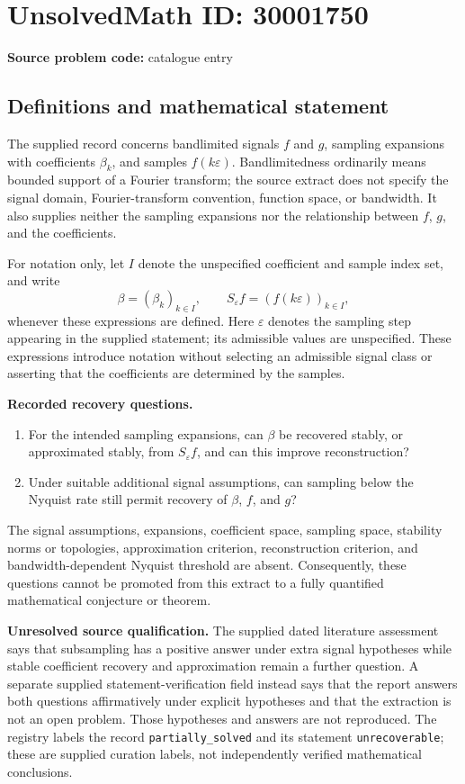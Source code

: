\documentclass[11pt]{article}
\begin{document}
\section*{UnsolvedMath ID: 30001750}
\textbf{Source problem code:} catalogue entry
\subsection{Definitions and mathematical statement}
The supplied record concerns bandlimited signals \(f\) and \(g\), sampling expansions with coefficients \(\beta_k\), and samples \(f(k\varepsilon)\). Bandlimitedness ordinarily means bounded support of a Fourier transform; the source extract does not specify the signal domain, Fourier-transform convention, function space, or bandwidth. It also supplies neither the sampling expansions nor the relationship between \(f\), \(g\), and the coefficients.

For notation only, let \(I\) denote the unspecified coefficient and sample index set, and write
\[
\beta=(\beta_k)_{k\in I},\qquad S_{\varepsilon}f=(f(k\varepsilon))_{k\in I},
\]
whenever these expressions are defined. Here \(\varepsilon\) denotes the sampling step appearing in the supplied statement; its admissible values are unspecified. These expressions introduce notation without selecting an admissible signal class or asserting that the coefficients are determined by the samples.

\textbf{Recorded recovery questions.}
\begin{enumerate}
\item For the intended sampling expansions, can \(\beta\) be recovered stably, or approximated stably, from \(S_{\varepsilon}f\), and can this improve reconstruction?
\item Under suitable additional signal assumptions, can sampling below the Nyquist rate still permit recovery of \(\beta\), \(f\), and \(g\)?
\end{enumerate}
The signal assumptions, expansions, coefficient space, sampling space, stability norms or topologies, approximation criterion, reconstruction criterion, and bandwidth-dependent Nyquist threshold are absent. Consequently, these questions cannot be promoted from this extract to a fully quantified mathematical conjecture or theorem.

\textbf{Unresolved source qualification.} The supplied dated literature assessment says that subsampling has a positive answer under extra signal hypotheses while stable coefficient recovery and approximation remain a further question. A separate supplied statement-verification field instead says that the report answers both questions affirmatively under explicit hypotheses and that the extraction is not an open problem. Those hypotheses and answers are not reproduced. The registry labels the record \texttt{partially\_solved} and its statement \texttt{unrecoverable}; these are supplied curation labels, not independently verified mathematical conclusions.
\end{document}
